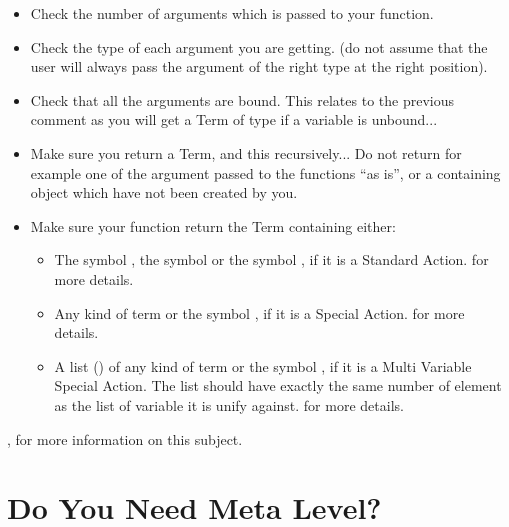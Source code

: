 \begin{itemize}

\item Check the number of arguments which is passed to your function.

\item Check the type of each argument you are getting. (do not assume
that the user will always pass the argument of the right type at the
right position).

\item Check that all the arguments are bound. This relates to the previous
comment as you will get a Term of type  if a variable is
unbound...

\item Make sure you return a  Term, and this recursively...
Do not return for example one of the argument passed to the functions
``as is'', or a  containing object which have not been created
by you.

\item Make sure your function return the Term containing either:

\begin{itemize}

\item The symbol , the symbol  or the symbol
, if it is a Standard Action.  for more
details.

\item Any kind of term or the symbol , if it is a Special
Action.  for more details.

\item A list () of any kind of term or the symbol , if it
is a Multi Variable Special Action. The list should have exactly the same
number of element as the list of variable it is unify against.
 for more details.

\end{itemize}
\end{itemize}

, for more information
on this subject.

\section{Do You Need Meta Level?}

